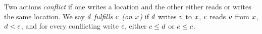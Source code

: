 \begin{definition}
   \label{def:rf}
 Two actions \emph{conflict} if one writes a location and the other
either reads or writes the same location.
We say $d$ \emph{fulfills $e$ (on $x$)} if 
{} $d$ \externally writes $v$ to $x$, 
{} $e$ \externally reads $v$ from $x$,
{} $d < e$, and
{} for every conflicting write $c$, either $c
\leq d$ or $e \leq c$. %
\end{definition}

